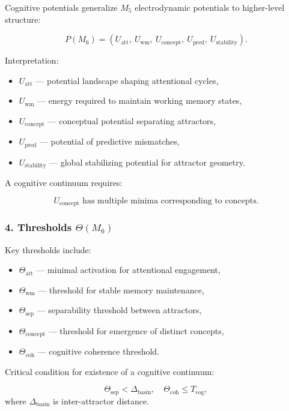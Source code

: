 Cognitive potentials generalize $M_5$ electrodynamic potentials to higher-level structure:

\[
P(M_6) =
(U_{\mathrm{att}},\
U_{\mathrm{wm}},\
U_{\mathrm{concept}},\
U_{\mathrm{pred}},\
U_{\mathrm{stability}}).
\]

Interpretation:

\begin{itemize}
    \item $U_{\mathrm{att}}$ — potential landscape shaping attentional cycles,
    \item $U_{\mathrm{wm}}$ — energy required to maintain working memory states,
    \item $U_{\mathrm{concept}}$ — conceptual potential separating attractors,
    \item $U_{\mathrm{pred}}$ — potential of predictive mismatches,
    \item $U_{\mathrm{stability}}$ — global stabilizing potential for attractor geometry.
\end{itemize}

A cognitive continuum requires:

\[
U_{\mathrm{concept}} \text{ has multiple minima corresponding to concepts}.
\]

\subsubsection*{4. Thresholds \texorpdfstring{$\Theta(M_6)$}{\Theta(M_6)}}

Key thresholds include:

\begin{itemize}
    \item $\Theta_{\mathrm{att}}$ — minimal activation for attentional engagement,
    \item $\Theta_{\mathrm{wm}}$ — threshold for stable memory maintenance,
    \item $\Theta_{\mathrm{sep}}$ — separability threshold between attractors,
    \item $\Theta_{\mathrm{concept}}$ — threshold for emergence of distinct concepts,
    \item $\Theta_{\mathrm{coh}}$ — cognitive coherence threshold.
\end{itemize}

Critical condition for existence of a cognitive continuum:

\[
\Theta_{\mathrm{sep}} < \Delta_{\mathrm{basin}},
\quad
\Theta_{\mathrm{coh}} \le T_{\mathrm{cog}},
\]
where $\Delta_{\mathrm{basin}}$ is inter-attractor distance.

